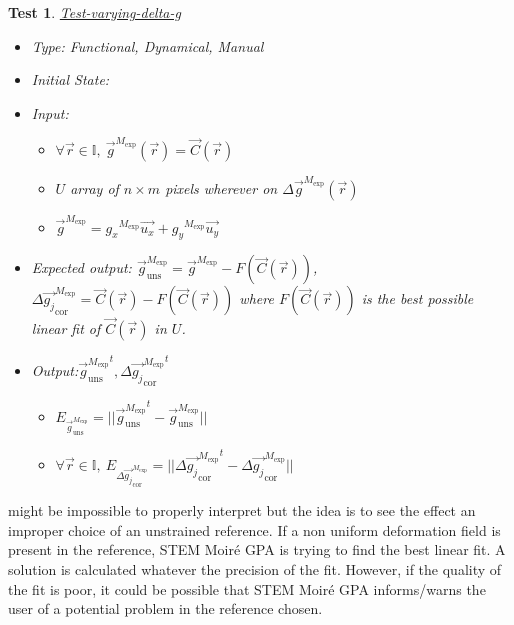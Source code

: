 \documentclass[12pt, titlepage]{article}
\newcommand{\progname}{STEM Moir{\'e} GPA}
\newtheorem{Test}{Test}
\begin{document}
\begin{Test}\normalfont\underline{Test-varying-delta-g}
\label{T_varying-delta-g}
\begin{itemize}
\item Type: Functional, Dynamical, Manual
\item Initial State: 
\item Input: 
	\begin{itemize}
	\item $\forall \vec{r} \in \mathbb{I}, \ \overrightarrow{g}^{M_{\text{exp}}}(\vec{r})=\overrightarrow{C}(\vec{r})$
	\item $U$ array of $n \times m$ pixels wherever on $\Delta \overrightarrow{g}^{M_{\text{exp}}}(\vec{r})$
	\item $\overrightarrow{g}^{M_{\text{exp}}}={g_x}^{M_{\text{exp}}}\overrightarrow{u_x}+{g_y}^{M_{\text{exp}}}\overrightarrow{u_y}$
\end{itemize}
\item Expected output: $\overrightarrow{g}_{\text{uns}}^{M_{\text{exp}}}=\overrightarrow{g}^{M_{\text{exp}}}-F(\overrightarrow{C}(\vec{r}))$,   $\Delta\overrightarrow{g_{j}}_{\text{cor}}^{M_{\text{exp}}}=\overrightarrow{C}(\vec{r})-F(\overrightarrow{C}(\vec{r}))$ where $F(\overrightarrow{C}(\vec{r}))$ is the best possible linear fit of $\overrightarrow{C}(\vec{r})$ in $U$.
\item Output:${\overrightarrow{g}_{\text{uns}}^{M_{\text{exp}}}}^{t}, {\Delta\overrightarrow{g_{j}}_{\text{cor}}^{M_{\text{exp}}}}^{t}$
	\begin{itemize}
	\item $E_{\overrightarrow{g}_{\text{uns}}^{M_{\text{exp}}}}=||{\overrightarrow{g}_{\text{uns}}^{M_{\text{exp}}}}^{t}-\overrightarrow{g}_{\text{uns}}^{M_{\text{exp}}}||$
	\item $\forall \vec{r} \in \mathbb{I}, \ E_{\Delta\overrightarrow{g_{j}}_{\text{cor}}^{M_{\text{exp}}}}=||{\Delta\overrightarrow{g_{j}}_{\text{cor}}^{M_{\text{exp}}}}^{t}-\Delta\overrightarrow{g_{j}}_{\text{cor}}^{M_{\text{exp}}}||$
	\end{itemize}
\end{itemize}
\end{Test}

 might be impossible to properly interpret but the idea is to see the effect an improper choice of an unstrained reference. If a non uniform deformation field is present in the reference, \progname{} is trying to find the best linear fit. A solution is calculated whatever the precision of the fit. However, if the quality of the fit is poor, it could be possible that \progname{} informs/warns the user of a potential problem in the reference chosen.
\end{document}
